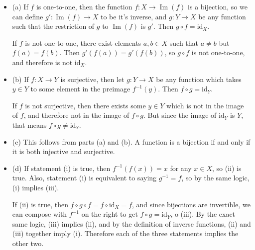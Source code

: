 \documentclass[12pt]{article}
\begin{document}
\begin{itemize}
    \item (a) If $f$ is one-to-one, then the function $f: X \rightarrow \operatorname{Im}(f)$ is a bijection, so we can define $g': \operatorname{Im}(f) \rightarrow X$ to be it's inverse, and $g: Y \rightarrow X$ be any function such that the restriction of $g$ to $ \operatorname{Im}(f)$ is $g'$. Then $g \circ f = \mathrm{id}_X$.
        \par
        If $f$ is not one-to-one, there exist elements $a,b \in X$ such that $a \neq b$ but $f(a)=f(b)$. Then $g'(f(a))=g'(f(b))$, so $g \circ f$ is not one-to-one, and therefore is not $\mathrm{id}_X$.
    \item (b) If $f: X \rightarrow Y$ is surjective, then let $g: Y \rightarrow X$ be any function which takes $y \in Y$ to some element in the preimage $f^{-1}(y)$. Then $f \circ g = \mathrm{id}_Y$.
        \par
        If $f$ is not surjective, then there exists some $y \in Y$ which is not in the image of $f$, and therefore not in the image of $f \circ g$. But since the image of $\mathrm{id}_Y$ is $Y$, that means $f \circ g \neq \mathrm{id}_Y$.
    \item (c) This follows from parts (a) and (b). A function is a bijection if and only if it is both injective and surjective.
    \item (d) If statement (i) is true, then $f^{-1}(f(x))=x$ for any $x \in X$, so (ii) is true. Also, statement (i) is equivalent to saying $g^{-1}=f$, so by the same logic, (i) implies (iii).
        \par
        If (ii) is true, then $f \circ g \circ f = f \circ \mathrm{id}_X = f$, and since bijections are invertible, we can compose with $f^{-1}$ on the right to get $f \circ g = \mathrm{id}_Y$, o (iii). By the exact same logic, (iii) implies (ii), and by the definition of inverse functions, (ii) and (iii) together imply (i). Therefore each of the three statements implies the other two.
\end{itemize}
\end{document}
